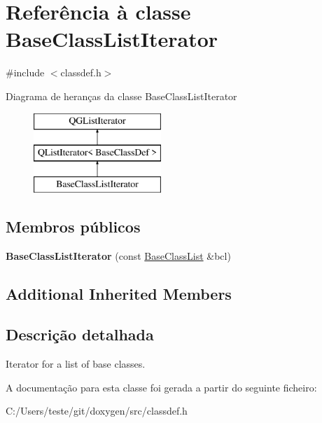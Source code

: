 \hypertarget{class_base_class_list_iterator}{\section{Referência à classe Base\-Class\-List\-Iterator}
\label{class_base_class_list_iterator}
}


{\ttfamily \#include $<$classdef.\-h$>$}

Diagrama de heranças da classe Base\-Class\-List\-Iterator\begin{figure}[H]
\begin{center}
\leavevmode
\includegraphics[height=3.000000cm]{class_base_class_list_iterator}
\end{center}
\end{figure}
\subsection*{Membros públicos}
\begin{DoxyCompactItemize}
\item 
\hypertarget{class_base_class_list_iterator_a77416faf22eb0e4fa88f537e974e2e91}{{\bfseries Base\-Class\-List\-Iterator} (const \hyperlink{class_base_class_list}{Base\-Class\-List} \&bcl)}\label{class_base_class_list_iterator_a77416faf22eb0e4fa88f537e974e2e91}

\end{DoxyCompactItemize}
\subsection*{Additional Inherited Members}


\subsection{Descrição detalhada}
Iterator for a list of base classes. 

A documentação para esta classe foi gerada a partir do seguinte ficheiro\-:\begin{DoxyCompactItemize}
\item 
C\-:/\-Users/teste/git/doxygen/src/classdef.\-h\end{DoxyCompactItemize}
